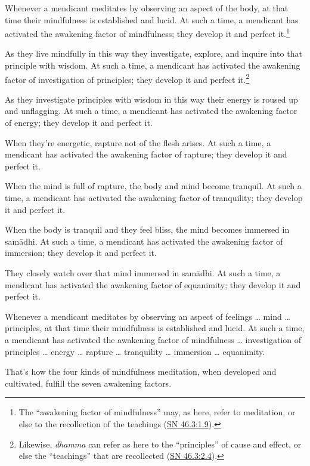 \documentclass[12pt,openany]{book}%
\begin{document}
Whenever a mendicant meditates by observing an aspect of the body, at that time their mindfulness is established and lucid. At such a time, a mendicant has activated the awakening factor of mindfulness; they develop it and perfect it.\footnote{The “awakening factor of mindfulness” may, as here, refer to meditation, or else to the recollection of the teachings (\href{https://suttacentral.net/sn46.3/en/sujato\#1.9}{SN 46.3:1.9}). } 

As they live mindfully in this way they investigate, explore, and inquire into that principle with wisdom. At such a time, a mendicant has activated the awakening factor of investigation of principles; they develop it and perfect it.\footnote{Likewise, \textit{dhamma} can refer as here to the “principles” of cause and effect, or else the “teachings” that are recollected (\href{https://suttacentral.net/sn46.3/en/sujato\#2.4}{SN 46.3:2.4}). } 

As they investigate principles with wisdom in this way their energy is roused up and unflagging. At such a time, a mendicant has activated the awakening factor of energy; they develop it and perfect it. 

When they’re energetic, rapture not of the flesh arises. At such a time, a mendicant has activated the awakening factor of rapture; they develop it and perfect it. 

When the mind is full of rapture, the body and mind become tranquil. At such a time, a mendicant has activated the awakening factor of tranquility; they develop it and perfect it. 

When the body is tranquil and they feel bliss, the mind becomes immersed in \textsanskrit{samādhi}. At such a time, a mendicant has activated the awakening factor of immersion; they develop it and perfect it. 

They closely watch over that mind immersed in \textsanskrit{samādhi}. At such a time, a mendicant has activated the awakening factor of equanimity; they develop it and perfect it. 

Whenever a mendicant meditates by observing an aspect of feelings … mind … principles, at that time their mindfulness is established and lucid. At such a time, a mendicant has activated the awakening factor of mindfulness … investigation of principles … energy … rapture … tranquility … immersion … equanimity. 

That’s how the four kinds of mindfulness meditation, when developed and cultivated, fulfill the seven awakening factors. 
\end{document}
